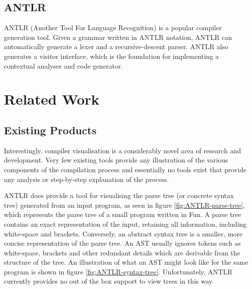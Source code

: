 \documentclass{l4proj}
\begin{document}
\section{ANTLR}
ANTLR (Another Tool For Language Recognition) is a popular compiler generation tool. Given a grammar written in ANTLR notation, ANTLR can automatically generate a lexer and a recursive-descent parser. ANTLR also generates a visitor interface, which is the foundation for implementing a contextual analyser and code generator.

\chapter{Related Work}
\section{Existing Products}
Interestingly, compiler visualisation is a considerably novel area of research and development. Very few existing tools provide any illustration of the various components of the compilation process and essentially no tools exist that provide any analysis or step-by-step explanation of the process.

ANTLR does provide a tool for visualising the parse tree (or concrete syntax tree) generated from an input program, as seen in figure \ref{fig:ANTLR-parse-tree}, which represents  the parse tree of a small program written in Fun. A parse tree contains an exact representation of the input, retaining all information, including white-space and brackets. Conversely, an abstract syntax tree is a smaller, more concise representation of the parse tree. An AST usually ignores tokens such as white-space, brackets and other redundant details which are derivable from the structure of the tree. An illustration of what an AST might look like for the same program is shown in figure \ref{fig:ANTLR-syntax-tree}. Unfortunately, ANTLR currently provides no out of the box support to view trees in this way.
\end{document}
